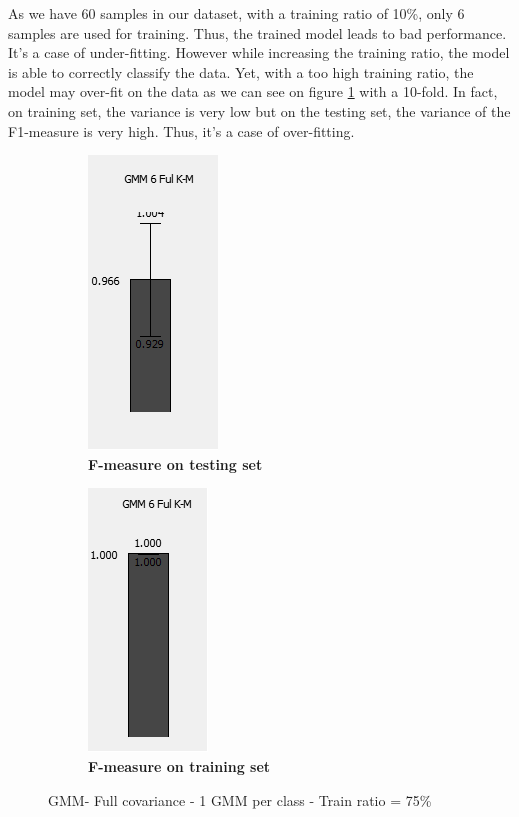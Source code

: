 As we have 60 samples in our dataset, with a training ratio of 10\%, only 6 samples are used for training. Thus, the trained model leads to bad performance. It's a case of under-fitting. However while increasing the training ratio, the model is able to correctly classify the data. Yet, with a too high training ratio, the model may over-fit on the data as we can see on figure \ref{fig:train_ratio_overfit} with a 10-fold. In fact, on training set, the variance is very low but on the testing set, the variance of the F1-measure is very high. Thus, it's a case of over-fitting. 

\begin{figure} [ht]
\centering
	\begin{subfigure}[h]{0.49\textwidth}
    \centering
	\includegraphics[height=0.08\textheight]{./classification/f_measure_testing_75pourcent.png}
	\caption{\bf F-measure on testing set}
	\end{subfigure}
    \begin{subfigure}[h]{0.49\textwidth}
    \centering
    \includegraphics[height=0.08\textheight]{./classification/f_measure_training_75pourcent.png}
	\caption{\bf F-measure on training set}
    \end{subfigure}

\caption{GMM- Full covariance - 1 GMM per class - Train ratio = 75\%}
\label{fig:train_ratio_overfit}
\end{figure}

